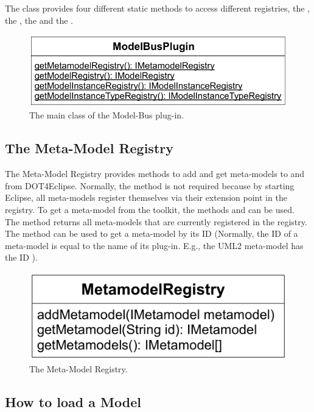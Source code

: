 The class provides four different static methods to access different registries, the , the , the  and the .

\begin{figure}[!b]
	\centering
	\includegraphics[width=.8\linewidth]{figures/integration/modelBusPlugin}
	\caption{The main class of the Model-Bus plug-in.}
	\label{pic:integration:modelBusPlugin}
\end{figure}


\subsection{The Meta-Model Registry}

The Meta-Model Registry provides methods to add and get meta-models to and from \acl{DOT4Eclipse}. Normally, the method  is not required because by starting Eclipse, all meta-models register themselves via their extension point in the registry. To get a meta-model from the toolkit, the methods  and  can be used. The method  returns all meta-models that are currently registered in the registry. The method  can be used to get a meta-model by its ID (Normally, the ID of a meta-model is equal to the name of its plug-in. E.g., the \acs{UML}2 meta-model has the ID ).

\begin{figure}[!b]
	\centering
	\includegraphics[width=.55\linewidth]{figures/integration/metaModelRegistry}
	\caption{The Meta-Model Registry.}
	\label{pic:integration:metaModelRegistry}
\end{figure}


\subsection{How to load a Model}

